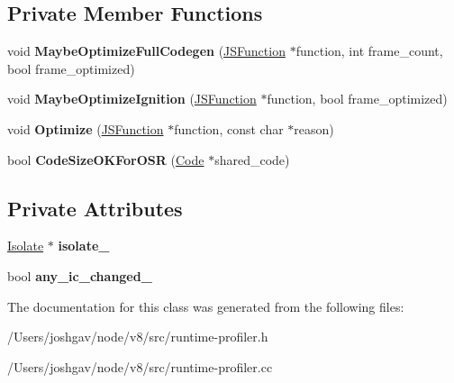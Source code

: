 \subsection*{Private Member Functions}
\begin{DoxyCompactItemize}
\item 
void {\bfseries Maybe\+Optimize\+Full\+Codegen} (\hyperlink{classv8_1_1internal_1_1_j_s_function}{J\+S\+Function} $\ast$function, int frame\+\_\+count, bool frame\+\_\+optimized)\hypertarget{classv8_1_1internal_1_1_runtime_profiler_a81a235de93f9736c00860625e007fc74}{}\label{classv8_1_1internal_1_1_runtime_profiler_a81a235de93f9736c00860625e007fc74}

\item 
void {\bfseries Maybe\+Optimize\+Ignition} (\hyperlink{classv8_1_1internal_1_1_j_s_function}{J\+S\+Function} $\ast$function, bool frame\+\_\+optimized)\hypertarget{classv8_1_1internal_1_1_runtime_profiler_a38a0945d3ad5eb580c1caae8c219609d}{}\label{classv8_1_1internal_1_1_runtime_profiler_a38a0945d3ad5eb580c1caae8c219609d}

\item 
void {\bfseries Optimize} (\hyperlink{classv8_1_1internal_1_1_j_s_function}{J\+S\+Function} $\ast$function, const char $\ast$reason)\hypertarget{classv8_1_1internal_1_1_runtime_profiler_ad9ae4adb688273c81c97902710f81844}{}\label{classv8_1_1internal_1_1_runtime_profiler_ad9ae4adb688273c81c97902710f81844}

\item 
bool {\bfseries Code\+Size\+O\+K\+For\+O\+SR} (\hyperlink{classv8_1_1internal_1_1_code}{Code} $\ast$shared\+\_\+code)\hypertarget{classv8_1_1internal_1_1_runtime_profiler_a1ffafadd6a65044d802c8a93f9fe0485}{}\label{classv8_1_1internal_1_1_runtime_profiler_a1ffafadd6a65044d802c8a93f9fe0485}

\end{DoxyCompactItemize}
\subsection*{Private Attributes}
\begin{DoxyCompactItemize}
\item 
\hyperlink{classv8_1_1internal_1_1_isolate}{Isolate} $\ast$ {\bfseries isolate\+\_\+}\hypertarget{classv8_1_1internal_1_1_runtime_profiler_af6fdad5f51136a2be887f839b8899a9d}{}\label{classv8_1_1internal_1_1_runtime_profiler_af6fdad5f51136a2be887f839b8899a9d}

\item 
bool {\bfseries any\+\_\+ic\+\_\+changed\+\_\+}\hypertarget{classv8_1_1internal_1_1_runtime_profiler_a294118034ac5c9e7664f188f6554a43e}{}\label{classv8_1_1internal_1_1_runtime_profiler_a294118034ac5c9e7664f188f6554a43e}

\end{DoxyCompactItemize}


The documentation for this class was generated from the following files\+:\begin{DoxyCompactItemize}
\item 
/\+Users/joshgav/node/v8/src/runtime-\/profiler.\+h\item 
/\+Users/joshgav/node/v8/src/runtime-\/profiler.\+cc\end{DoxyCompactItemize}
